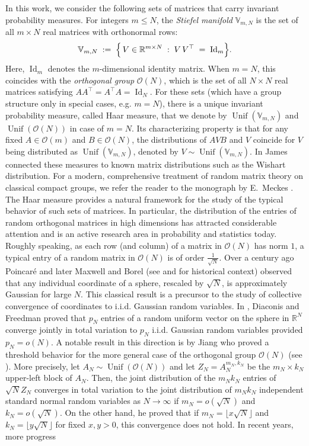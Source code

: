 \documentclass[11pt,a4paper,twoside]{article}
\newcommand{\V}{\mathbb V}
\newcommand{\R}{\mathbb R}
\renewcommand{\O}{\mathcal O}
\DeclareMathOperator{\Unif}{Unif}
\theoremstyle{definition}
\begin{document}
In this work, we consider the following sets of matrices that carry invariant probability measures. For integers \(m \leq N\), the \emph{Stiefel manifold} \(\mathbb{V}_{m,N}\) is the set of all \(m \times N\) real matrices with orthonormal rows:
	\begin{align}
		\mathbb{V}_{m,N} \; := \; \Bigl\{\, V \in \mathbb{R}^{m\times N} \;:\; V\,V^\top \;=\; \operatorname{Id}_m \Bigr\}.
	\end{align}
	Here, $\operatorname{Id}_m$ denotes the $m$-dimensional identity matrix. When \(m = N\), this coincides with the \emph{orthogonal group} \(\O(N)\), which is the set of all \(N \times N\) real matrices satisfying $A A^\top = A^\top A = \operatorname{Id}_N$. For these sets (which have a group structure only in special cases, e.g. $m=N$), there is a unique invariant probability measure, called Haar measure, that we denote by $\Unif(\V_{m,N})$ and $\Unif(\O(N))$ in case of $m= N$. Its characterizing property is that for any fixed $A\in \O(m)$ and $B\in \O(N)$, the distributions of $A V B$ and $V$ coincide for $V$ being distributed as $\Unif(\V_{m,N})$, denoted by $V\sim \Unif(\V_{m,N})$. In \cite{james1954normal} James connected these measures to known matrix distributions such as the Wishart distribution. For a modern, comprehensive treatment of random matrix theory on classical compact groups, we refer the reader to the monograph by E.\ Meckes \cite{meckes2019random}. The Haar measure provides a natural framework for the study of the typical behavior of such sets of matrices. In particular, the distribution of the entries of random orthogonal matrices in high dimensions has attracted considerable attention and is an active research area in probability and statistics today. Roughly speaking, as each row (and column) of a matrix in $\O(N)$ has norm $1$, a typical entry of a random matrix in $\O(N)$ is of order $\frac{1}{\sqrt{N}}$. Over a century ago Poincaré and later Maxwell and Borel (see \cite{borel1914introduction} and \cite[Chapter 6]{diaconis1987dozen} for historical context) observed that any individual coordinate of a sphere, rescaled by $\sqrt{N}$, is approximately Gaussian for large $N$. This classical result is a precursor to the study of collective convergence of coordinates to i.i.d. Gaussian random variables. In \cite{diaconis1987dozen}, Diaconis and Freedman proved that $p_N$ entries of a random uniform vector on the sphere in $\R^N$ converge jointly in total variation to $p_N$ i.i.d. Gaussian random variables provided $p_N = o(N)$. A notable result in this direction is by Jiang who proved a threshold behavior for the more general case of the orthogonal group $\O(N)$ (see \cite{jiang2006many}). More precisely, let $A_N\sim \Unif(\O(N))$ and let $Z_N = A_N^{m_N, k_N}$ be the $m_N \times k_N$ upper-left block of $A_N$. Then, the joint distribution of the $m_N k_N$ entries of $\sqrt{N} Z_N$ converges in total variation to the joint distribution of $m_N k_N$ independent standard normal random variables as $N\to\infty$ if $m_N = o(\sqrt{N})$ and $k_N = o(\sqrt{N})$. On the other hand, he proved that if $m_N = \lfloor x\sqrt{N} \rfloor$ and $k_N = \lfloor y\sqrt{N} \rfloor$ for fixed $x, y > 0$, this convergence does not hold. In recent years, more progress 
\end{document}
